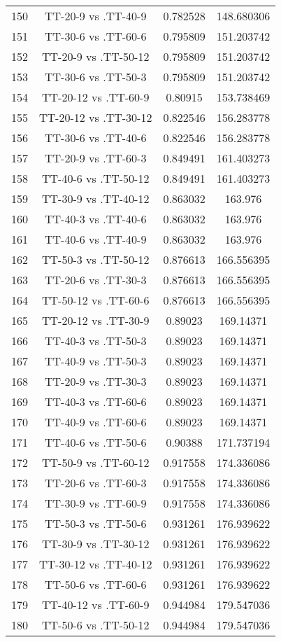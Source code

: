 \documentclass[a4paper,10pt]{article}
\begin{document}
\begin{landscape}
\begin{table}[!htp]
\begin{tabular}{cccc}
150&TT-20-9 vs .TT-40-9&0.782528&148.680306\\
151&TT-30-6 vs .TT-60-6&0.795809&151.203742\\
152&TT-20-9 vs .TT-50-12&0.795809&151.203742\\
153&TT-30-6 vs .TT-50-3&0.795809&151.203742\\
154&TT-20-12 vs .TT-60-9&0.80915&153.738469\\
155&TT-20-12 vs .TT-30-12&0.822546&156.283778\\
156&TT-30-6 vs .TT-40-6&0.822546&156.283778\\
157&TT-20-9 vs .TT-60-3&0.849491&161.403273\\
158&TT-40-6 vs .TT-50-12&0.849491&161.403273\\
159&TT-30-9 vs .TT-40-12&0.863032&163.976\\
160&TT-40-3 vs .TT-40-6&0.863032&163.976\\
161&TT-40-6 vs .TT-40-9&0.863032&163.976\\
162&TT-50-3 vs .TT-50-12&0.876613&166.556395\\
163&TT-20-6 vs .TT-30-3&0.876613&166.556395\\
164&TT-50-12 vs .TT-60-6&0.876613&166.556395\\
165&TT-20-12 vs .TT-30-9&0.89023&169.14371\\
166&TT-40-3 vs .TT-50-3&0.89023&169.14371\\
167&TT-40-9 vs .TT-50-3&0.89023&169.14371\\
168&TT-20-9 vs .TT-30-3&0.89023&169.14371\\
169&TT-40-3 vs .TT-60-6&0.89023&169.14371\\
170&TT-40-9 vs .TT-60-6&0.89023&169.14371\\
171&TT-40-6 vs .TT-50-6&0.90388&171.737194\\
172&TT-50-9 vs .TT-60-12&0.917558&174.336086\\
173&TT-20-6 vs .TT-60-3&0.917558&174.336086\\
174&TT-30-9 vs .TT-60-9&0.917558&174.336086\\
175&TT-50-3 vs .TT-50-6&0.931261&176.939622\\
176&TT-30-9 vs .TT-30-12&0.931261&176.939622\\
177&TT-30-12 vs .TT-40-12&0.931261&176.939622\\
178&TT-50-6 vs .TT-60-6&0.931261&176.939622\\
179&TT-40-12 vs .TT-60-9&0.944984&179.547036\\
180&TT-50-6 vs .TT-50-12&0.944984&179.547036\\

\end{tabular}
\end{table}
\end{landscape}
\end{document}
